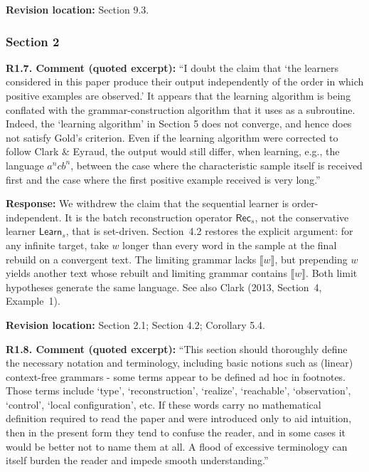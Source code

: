 \documentclass[
  10pt,
  a4paper,
]{article}
\newcommand{\NT}[1]{\llbracket #1\rrbracket}
\begin{document}
\textbf{Revision location:} Section 9.3.


\subsubsection{Section 2}\label{section-2}

\textbf{R1.7. Comment (quoted excerpt):} ``I doubt the claim that `the
learners considered in this paper produce their output independently of
the order in which positive examples are observed.' It appears that the
learning algorithm is being conflated with the grammar-construction
algorithm that it uses as a subroutine. Indeed, the `learning algorithm'
in Section 5 does not converge, and hence does not satisfy Gold's
criterion. Even if the learning algorithm were corrected to follow Clark
\& Eyraud, the output would still differ, when learning, e.g., the
language \(a^n c b^n\), between the case where the characteristic
sample itself is received first and the case where the first positive
example received is very long.''

\textbf{Response:} We withdrew the claim that the sequential learner is
order-independent. It is the batch reconstruction operator
$\mathsf{Rec}_s$, not the conservative learner $\mathsf{Learn}_s$,
that is set-driven. Section~4.2 restores the explicit argument:
for any infinite target, take $w$ longer than every word in the
sample at the final rebuild on a convergent text. The limiting
grammar lacks $\NT{w}$, but prepending $w$ yields another text
whose rebuilt and limiting grammar contains $\NT{w}$.
Both limit hypotheses generate the same language. See also
Clark (2013, Section~4, Example~1).

\textbf{Revision location:} Section 2.1; Section 4.2; Corollary 5.4.


\textbf{R1.8. Comment (quoted excerpt):} ``This section should thoroughly
define the necessary notation and terminology, including basic notions
such as (linear) context-free grammars - some terms appear to be defined
ad hoc in footnotes. Those terms include `type', `reconstruction',
`realize', `reachable', `observation',
`control', `local configuration', etc. If these words carry no
mathematical definition required to read the paper and were introduced
only to aid intuition, then in the present form they tend to confuse the
reader, and in some cases it would be better not to name them at all. A
flood of excessive terminology can itself burden the reader and impede
smooth understanding.''
\end{document}
